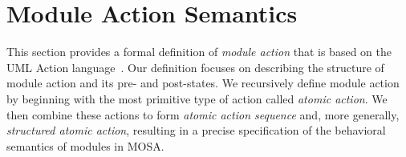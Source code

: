 
\section{Module Action Semantics}
\label{sect:actSemantics}

This section provides a formal definition of \textit{module action} that is based on the UML Action language~\cite{omg_unified_2017}. %
Our definition focuses on describing the structure of module action and its pre- and post-states. %
%
We recursively define module action by beginning with the most primitive type of action called \textit{atomic action}. We then combine these actions to form \textit{atomic action sequence} and, more generally, \textit{structured atomic action}, resulting in a precise specification of the behavioral semantics of modules in MOSA. 

